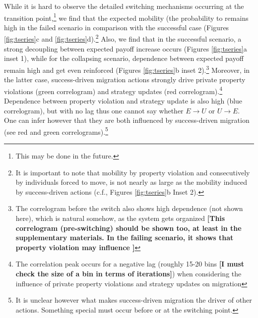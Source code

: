 While it is hard to observe the detailed switching mechanisms occurring at the transition point,\footnote{This may be done in the future.} we find that the expected mobility (the probability to remains high in the failed scenario in comparison with the successful case (Figures \ref{fig:tseries}c and \ref{fig:tseries}d).\footnote{It is important to note that mobility by property violation and consecutively by individuals forced to move, is not nearly as large as the mobility induced by success-driven actions (c.f., Figures \ref{fig:tseries}b Inset 2).} Also, we find that in the successful scenario, a strong decoupling between expected payoff increase occurs (Figures \ref{fig:tseries}a inset 1), while for the collapsing scenario, dependence between expected payoff remain high and get even reinforced (Figures \ref{fig:tseries}b inset 2).\footnote{The correlogram before the switch also shows high dependence (not shown here), which is natural somehow, as the system gets organized {\bf [This correlogram (pre-switching) should be shown too, at least in the supplementary materials. In the failing scenario, it shows that property violation may influence ]}} Moreover, in the latter case, success-driven migration actions strongly drive private property violations (green correlogram) and strategy updates (red correlogram).\footnote{The correlation peak occurs for a negative lag (roughly 15-20 bins {\bf [I must check the size of a bin in terms of iterations]}) when considering the influence of private property violations and strategy updates on migration} Dependence between property violation and strategy update is also high (blue correlogram), but with no lag thus one cannot say whether $E \rightarrow U$ or $U \rightarrow E$. One can infer however that they are both influenced by success-driven migration (see red and green correlograms).\footnote{It is unclear however what makes success-driven migration the driver of other actions. Something special must occur before or at the switching point.}\\

